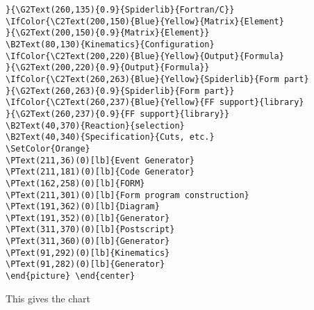 \begin{verbatim}
}{\G2Text(260,135){0.9}{Spiderlib}{Fortran/C}}
\IfColor{\C2Text(200,150){Blue}{Yellow}{Matrix}{Element}
}{\G2Text(200,150){0.9}{Matrix}{Element}}
\B2Text(80,130){Kinematics}{Configuration}
\IfColor{\C2Text(200,220){Blue}{Yellow}{Output}{Formula}
}{\G2Text(200,220){0.9}{Output}{Formula}}
\IfColor{\C2Text(260,263){Blue}{Yellow}{Spiderlib}{Form part}
}{\G2Text(260,263){0.9}{Spiderlib}{Form part}}
\IfColor{\C2Text(260,237){Blue}{Yellow}{FF support}{library}
}{\G2Text(260,237){0.9}{FF support}{library}}
\B2Text(40,370){Reaction}{selection}
\B2Text(40,340){Specification}{Cuts, etc.}
\SetColor{Orange}
\PText(211,36)(0)[lb]{Event Generator}
\PText(211,181)(0)[lb]{Code Generator}
\PText(162,258)(0)[lb]{FORM}
\PText(211,301)(0)[lb]{Form program construction}
\PText(191,362)(0)[lb]{Diagram}
\PText(191,352)(0)[lb]{Generator}
\PText(311,370)(0)[lb]{Postscript}
\PText(311,360)(0)[lb]{Generator}
\PText(91,292)(0)[lb]{Kinematics}
\PText(91,282)(0)[lb]{Generator}
\end{picture} \end{center}
\end{verbatim}
\IfColor{\textBlack}{}
This gives the chart
